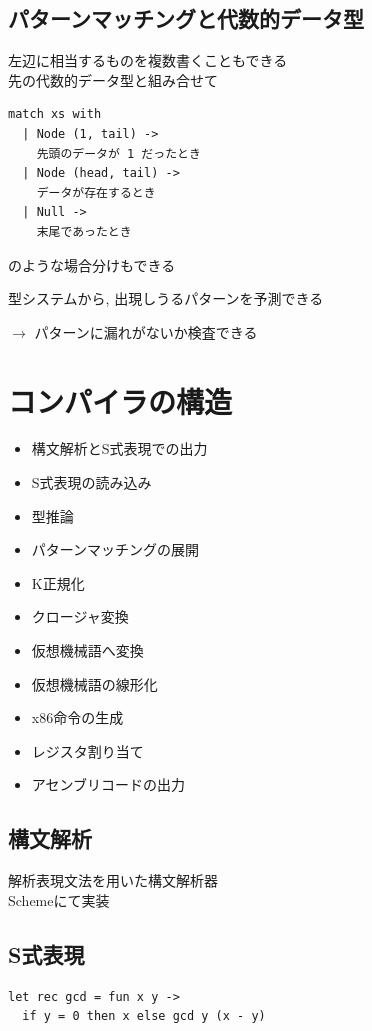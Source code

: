 \documentclass[papersize,30pt,slide]{jsarticle}
\begin{document}
\newpage
\subsection{パターンマッチングと代数的データ型}
左辺に相当するものを複数書くこともできる \\
先の代数的データ型と組み合せて
\begin{lstlisting}
match xs with
  | Node (1, tail) ->
    先頭のデータが 1 だったとき
  | Node (head, tail) ->
    データが存在するとき
  | Null ->
    末尾であったとき
\end{lstlisting}
のような場合分けもできる

型システムから, 出現しうるパターンを予測できる 

\hspace{1em} $\rightarrow$ パターンに漏れがないか検査できる


\section{コンパイラの構造}

\begin{itemize}
\item 構文解析とS式表現での出力 
\item S式表現の読み込み
\item 型推論
\item パターンマッチングの展開
\item K正規化
\item クロージャ変換
\item 仮想機械語へ変換
\item 仮想機械語の線形化
\item x86命令の生成
\item レジスタ割り当て
\item アセンブリコードの出力
\end{itemize}

\newpage

\subsection{構文解析}
解析表現文法を用いた構文解析器 \\
Schemeにて実装


\subsection{S式表現}
\begin{lstlisting}
let rec gcd = fun x y ->
  if y = 0 then x else gcd y (x - y)
\end{lstlisting}
\end{document}
